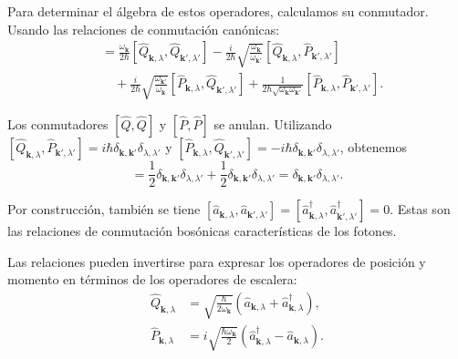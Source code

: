         Para determinar el álgebra de estos operadores, calculamos su conmutador. Usando las relaciones de conmutación canónicas:
        \begin{align}
            [\hat{a}_{\mathbf{k},\lambda}, \hat{a}^\dagger_{\mathbf{k}',\lambda'}] &= \frac{\omega_{\mathbf{k}}}{2\hbar}[\hat{Q}_{\mathbf{k},\lambda}, \hat{Q}_{\mathbf{k}',\lambda'}] - \frac{i}{2\hbar}\sqrt{\frac{\omega_{\mathbf{k}}}{\omega_{\mathbf{k}'}}}[\hat{Q}_{\mathbf{k},\lambda}, \hat{P}_{\mathbf{k}',\lambda'}] \nonumber \\
            &\quad + \frac{i}{2\hbar}\sqrt{\frac{\omega_{\mathbf{k}'}}{\omega_{\mathbf{k}}}}[\hat{P}_{\mathbf{k},\lambda}, \hat{Q}_{\mathbf{k}',\lambda'}] + \frac{1}{2\hbar\sqrt{\omega_{\mathbf{k}}\omega_{\mathbf{k}'}}}[\hat{P}_{\mathbf{k},\lambda}, \hat{P}_{\mathbf{k}',\lambda'}].
        \end{align}
        
        Los conmutadores $[\hat{Q}, \hat{Q}]$ y $[\hat{P}, \hat{P}]$ se anulan. Utilizando $[\hat{Q}_{\mathbf{k},\lambda}, \hat{P}_{\mathbf{k}',\lambda'}] = i\hbar\delta_{\mathbf{k},\mathbf{k}'}\delta_{\lambda,\lambda'}$ y $[\hat{P}_{\mathbf{k},\lambda}, \hat{Q}_{\mathbf{k}',\lambda'}] = -i\hbar\delta_{\mathbf{k},\mathbf{k}'}\delta_{\lambda,\lambda'}$, obtenemos
        \begin{equation}
            [\hat{a}_{\mathbf{k},\lambda}, \hat{a}^\dagger_{\mathbf{k}',\lambda'}] = \frac{1}{2}\delta_{\mathbf{k},\mathbf{k}'}\delta_{\lambda,\lambda'} + \frac{1}{2}\delta_{\mathbf{k},\mathbf{k}'}\delta_{\lambda,\lambda'} = \delta_{\mathbf{k},\mathbf{k}'}\delta_{\lambda,\lambda'}.
        \end{equation}
        
        Por construcción, también se tiene $[\hat{a}_{\mathbf{k},\lambda}, \hat{a}_{\mathbf{k}',\lambda'}] = [\hat{a}^\dagger_{\mathbf{k},\lambda}, \hat{a}^\dagger_{\mathbf{k}',\lambda'}] = 0$. Estas son las relaciones de conmutación bosónicas características de los fotones.
        
        Las relaciones pueden invertirse para expresar los operadores de posición y momento en términos de los operadores de escalera:
        \begin{align}
            \hat{Q}_{\mathbf{k},\lambda} &= \sqrt{\frac{\hbar}{2\omega_{\mathbf{k}}}}\left(\hat{a}_{\mathbf{k},\lambda} + \hat{a}^\dagger_{\mathbf{k},\lambda}\right), \\
            \hat{P}_{\mathbf{k},\lambda} &= i\sqrt{\frac{\hbar\omega_{\mathbf{k}}}{2}}\left(\hat{a}^\dagger_{\mathbf{k},\lambda} - \hat{a}_{\mathbf{k},\lambda}\right).
        \end{align}
 
